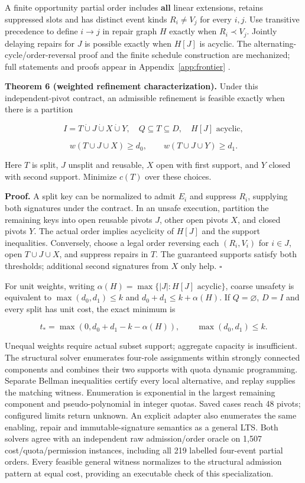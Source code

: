 A finite opportunity partial order includes \textbf{all} linear
extensions, retains suppressed slots and has distinct event kinds
\(R_i\ne V_j\) for every \(i,j\). Use transitive precedence to define
\(i\to j\) in repair graph \(H\) exactly when \(R_i\prec V_j\). Jointly
delaying repairs for \(J\) is possible exactly when \(H[J]\) is acyclic.
The alternating-cycle/order-reversal proof and the finite schedule
construction are mechanized; full statements and proofs appear in
Appendix~\ref{app:frontier} \cite{streib2014dimension}.

\textbf{Theorem 6 (weighted refinement characterization).} Under this
independent-pivot contract, an admissible refinement is feasible exactly
when there is a partition

\[
I=T\mathbin{\dot\cup}J\mathbin{\dot\cup}X\mathbin{\dot\cup}Y,
\quad Q\subseteq T\subseteq D,\quad H[J]\text{ acyclic},
\]

\[
w(T\cup J\cup X)\ge d_0,\qquad
w(T\cup J\cup Y)\ge d_1.
\]

Here \(T\) is split, \(J\) unsplit and reusable, \(X\) open with first
support, and \(Y\) closed with second support. Minimize \(c(T)\) over
these choices.

\textbf{Proof.} A split key can be normalized to admit \(E_i\) and
suppress \(R_i\), supplying both signatures under the contract. In an
unsafe execution, partition the remaining keys into open reusable pivots
\(J\), other open pivots \(X\), and closed pivots \(Y\). The actual
order implies acyclicity of \(H[J]\) and the support inequalities.
Conversely, choose a legal order reversing each \((R_i,V_i)\) for
\(i\in J\), open \(T\cup J\cup X\), and suppress repairs in \(T\). The
guaranteed supports satisfy both thresholds; additional second
signatures from \(X\) only help. \(\square\)

For unit weights, writing \(\alpha(H)=\max\{|J|:H[J]\text{ acyclic}\}\),
coarse unsafety is equivalent to \(\max(d_0,d_1)\le k\) and
\(d_0+d_1\le k+\alpha(H)\). If \(Q=\varnothing\), \(D=I\) and every
split has unit cost, the exact minimum is

\[
t_* = \max(0,d_0+d_1-k-\alpha(H)),
\qquad \max(d_0,d_1)\le k.
\]

Unequal weights require actual subset support; aggregate capacity is
insufficient. The structural solver enumerates four-role assignments
within strongly connected components and combines their two supports
with quota dynamic programming. Separate Bellman inequalities certify
every local alternative, and replay supplies the matching witness.
Enumeration is exponential in the largest remaining component and
pseudo-polynomial in integer quotas. Saved cases reach 48 pivots;
configured limits return unknown. An explicit adapter also enumerates
the same enabling, repair and immutable-signature semantics as a general
LTS. Both solvers agree with an independent raw admission/order oracle
on 1,507 cost/quota/permission instances, including all 219 labelled
four-event partial orders. Every feasible general witness normalizes to
the structural admission pattern at equal cost, providing an executable
check of this specialization.

